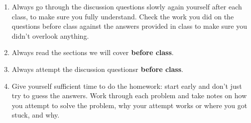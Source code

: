 \documentclass[12pt,dvipsnames]{article}
\begin{document}
\begin{mdframed}[style=exampledefault,linecolor=blue,linewidth=4pt,frametitle={Looking Ahead to Next Week...}]
\begin{enumerate}[label= {  \arabic*:},labelindent=2em, style = standard,leftmargin=4pc, labelsep=*, noitemsep]
 		\item  Always go through the discussion questions slowly again yourself after each class, to make sure you fully understand.
Check the  work you did on the questions before class against the answers provided in class to make sure you didn’t overlook anything.
\item Always read the sections we will cover{\bf{ before class}}.
\item Always attempt the discussion questionsr{\bf{ before class}}.
\item Give yourself sufficient time to do the homework: start early and don't just try to guess the answers. Work through each problem and take notes on how you attempt to solve the problem, why your attempt works or where you got stuck, and why.
\end{enumerate}
 	\end{mdframed}
\end{document}
